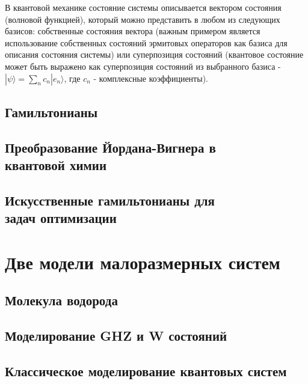 \documentclass[a4paper]{report}
\begin{document}
В квантовой механике состояние системы описывается вектором состояния (волновой функцией), который можно представить в любом из следующих базисов: собственные состояния вектора (важным примером является использование собственных состояний эрмитовых операторов как базиса для описания состояния системы) или суперпозиция состояний (квантовое состояние может быть выражено как суперпозиция состояний из выбранного базиса - ${|\psi\rangle = \sum_n c_n |e_n\rangle}$, где ${c_n}$ - комплексные коэффициенты).

\section{Гамильтонианы}

\section{Преобразование Йордана-Вигнера в\\ квантовой химии}

\section{Искусственные гамильтонианы для \\задач оптимизации}


\chapter{Две модели малоразмерных систем}


\section{Молекула водорода}

\section{Моделирование GHZ и W состояний}

\section{Классическое моделирование квантовых систем}
\end{document}
